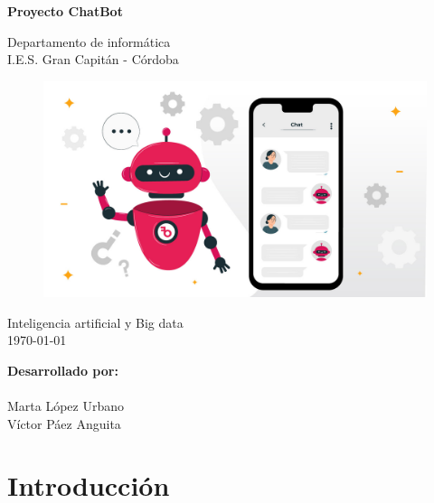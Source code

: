 \documentclass[12pt]{article}
\begin{document}
\begin{titlepage}
    \begin{center}
      \Large \bfseries{}
    \end{center}
    \vspace{0.1cm}
    \begin{center}
      \Large \bfseries{}
    \end{center}
    \vspace{0.1cm}
    \begin{center}
     \Large \bfseries{Proyecto ChatBot}
    \end{center}
    \vspace{0.0001cm}
    \begin{center}
        Departamento de informática \\ I.E.S. Gran Capitán - Córdoba
    \end{center}
        \vspace{2 cm}
\begin{figure}[h!]
    \centering
    \includegraphics[width=.6\textwidth]{assets/portada.jpg}
    \label{fig:my_label}
\end{figure}
    \vspace{0.2 cm}
    \begin{center}
        Inteligencia artificial y Big data \\ \today 
    \end{center}
    \vspace{4 cm}
\null\hfill \textbf{Desarrollado por:}
\\
\\
\null\hfill Marta López Urbano
\\
\null\hfill Víctor Páez Anguita
\clearpage
\end{titlepage}

\tableofcontents
\clearpage


\section{Introducción}
\end{document}
